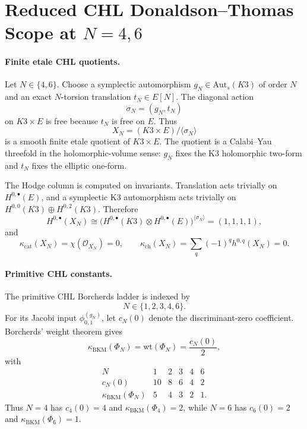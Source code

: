 \section{Reduced CHL Donaldson--Thomas Scope at \(N=4,6\)}
\label{wn:sec:reduced-chl-DT-N46}

\providecommand{\DTred}{Z^{\mathrm{red}}_{\mathrm{DT}}}
\providecommand{\PhiN}{\Phi_N}
\providecommand{\Dfive}{D_5}
\providecommand{\DeltaFive}{\Delta_5}
\providecommand{\kcat}{\kappa_{\mathrm{cat}}}
\providecommand{\kch}{\kappa_{\mathrm{ch}}}
\providecommand{\kBKM}{\kappa_{\mathrm{BKM}}}
\providecommand{\kfib}{\kappa_{\mathrm{fiber}}}
\providecommand{\Z}{\mathbb Z}

\paragraph{Finite etale CHL quotients.}
Let \(N\in\{4,6\}\).  Choose a symplectic automorphism
\(g_N\in\mathrm{Aut}_s(K3)\) of order \(N\) and an exact
\(N\)-torsion translation \(t_N\in E[N]\).  The diagonal action
\[
  \sigma_N=(g_N,t_N)
\]
on \(K3\times E\) is free because \(t_N\) is free on \(E\).  Thus
\[
  X_N=(K3\times E)/\langle\sigma_N\rangle
\]
is a smooth finite etale quotient of \(K3\times E\).  The quotient is a
Calabi--Yau threefold in the holomorphic-volume sense: \(g_N\) fixes the
K3 holomorphic two-form and \(t_N\) fixes the elliptic one-form.

The Hodge column is computed on invariants.  Translation acts trivially
on \(H^{0,\bullet}(E)\), and a symplectic K3 automorphism acts trivially
on \(H^{0,0}(K3)\oplus H^{0,2}(K3)\).  Therefore
\[
  H^{0,\bullet}(X_N)
  \cong
  \bigl(H^{0,\bullet}(K3)\otimes H^{0,\bullet}(E)\bigr)^{\langle\sigma_N\rangle}
  =
  (1,1,1,1),
\]
and
\[
  \kcat(X_N)=\chi(\mathcal O_{X_N})=0,\qquad
  \kch(X_N)=\sum_q(-1)^q h^{0,q}(X_N)=0.
\]

\paragraph{Primitive CHL constants.}
The primitive CHL Borcherds ladder is indexed by
\[
  N\in\{1,2,3,4,6\}.
\]
For its Jacobi input \(\phi^{(g_N)}_{0,1}\), let \(c_N(0)\) denote the
discriminant-zero coefficient.  Borcherds' weight theorem gives
\[
  \kBKM(\Phi_N)=\mathrm{wt}(\Phi_N)=\frac{c_N(0)}{2},
\]
with
\[
\begin{array}{c|ccccc}
N&1&2&3&4&6\\ \hline
c_N(0)&10&8&6&4&2\\
\kBKM(\Phi_N)&5&4&3&2&1 .
\end{array}
\]
Thus \(N=4\) has \(c_4(0)=4\) and \(\kBKM(\Phi_4)=2\), while
\(N=6\) has \(c_6(0)=2\) and \(\kBKM(\Phi_6)=1\).

